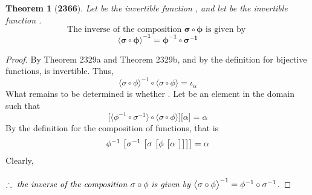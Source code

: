 \documentclass[preview]{standalone}
\newtheorem*{theorem*}{Theorem}
\begin{document}
\begin{theorem*}[\textbf{2366}]
    Let \bm{$\sigma$} be the invertible function 
    \bm{$\sigma : \Theta \rightarrow \Omega$}, 
    and let \bm{$\phi$} be the invertible function 
    \bm{$\phi : \Phi \rightarrow \Theta$}. 
    \begin{equation*}
        \text{The inverse of the composition }
        \bm{\sigma \circ \phi}
        \text{ is given by }
    \end{equation*}
    \begin{equation*}
        \bm{
            \big \langle \sigma \circ \phi \big \rangle ^{-1} 
                = \phi ^{-1} \circ \sigma ^{-1}
            }
    \end{equation*}
\end{theorem*}

\begin{proof}
    By Theorem 2329a and Theorem 2329b, and by the definition for bijective functions, 
    \bm{$\sigma \circ \phi$} is invertible. 
    Thus, 
    \begin{equation*}
        \big \langle \sigma \circ \phi \big \rangle ^{-1} 
            \circ 
        \big \langle \sigma \circ \phi \big \rangle 
            = 
        \iota_{\alpha}
    \end{equation*}
    What remains to be determined is whether 
    . 
    Let \bm{$\alpha$} be an element in the domain \bm{$\Phi$} such that 
    \begin{equation*}
        \big[
            \big \langle \phi ^{-1} \circ \sigma ^{-1} \big \rangle 
                \circ 
            \big \langle \sigma \circ \phi \big \rangle
        \big] 
            \big[ \alpha \big] 
            = 
        \alpha
    \end{equation*}
    By the definition for the composition of functions, 
    that is 
    \begin{equation*}
        \phi ^{-1} \text{\space} \big[ 
            \sigma ^{-1} \text{\space} \big[ 
                \sigma \text{\space} \big[ 
                    \phi \text{\space} \big[
                        \alpha \text{\space}
                    \big]
                \big]
            \big]
        \big]
             = 
        \alpha
    \end{equation*}
    Clearly, 
    \\ \\
    $\therefore \text{ \emph{the inverse of the composition} } \relax{
        \sigma \circ \phi 
        \text{ \emph{is given by} }
        \big \langle \sigma \circ \phi \big \rangle ^{-1} 
            = 
        \phi^{-1} \circ \sigma^{-1}
    }$.
\color{lightgray} \end{proof}
\end{document}

